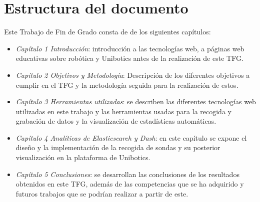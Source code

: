 \section{Estructura del documento}

Este Trabajo de Fin de Grado consta de de los siguientes capítulos:

\begin{itemize}
    \item \textit{Capítulo 1 Introducción}: introducción a las tecnologías web, a páginas web educativas sobre robótica y Unibotics antes de la realización de este TFG.
    \item \textit{Capítulo 2 Objetivos y Metodología}: Descripción de los diferentes objetivos a cumplir en el TFG y la metodología seguida para la realización de estos.
    \item \textit{Capítulo 3 Herramientas utilizadas}: se describen las diferentes tecnologías web utilizadas en este trabajo y las herramientas usadas para la recogida y grabación de datos y la visualización de estadísticas automáticas.
   \item \textit{Capítulo 4 Analíticas de Elasticsearch y Dash}: en este capítulo se expone el diseño y la implementación de la recogida de sondas y su posterior visualización en la plataforma de Unibotics.
  \item \textit{Capítulo 5 Conclusiones}: se desarrollan las conclusiones de los resultados obtenidos en este TFG, además de las competencias que se ha adquirido y futuros trabajos que se podrían realizar a partir de este.
   \end{itemize}